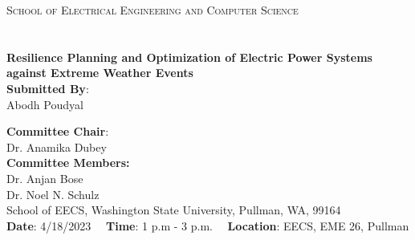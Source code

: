 \documentclass[hidelinks, 12pt]{article}
\begin{document}
\begin{titlepage}
\textsc{\large School of Electrical Engineering and Computer Science}\\[1.5cm] %
\textsc{\large {}}\\ %


\HRule \\
{ \Large \bfseries Resilience Planning and Optimization of Electric Power Systems against Extreme Weather Events}
\vspace{0.2 cm}
\HRule \\
 


\medskip
\large
{{\textbf{Submitted By}:\\ Abodh Poudyal }}\\ [0.5cm]

\medskip

\textbf{Committee Chair}:\\ Dr. Anamika Dubey \\ [0.5 cm]
\textbf{Committee Members:} \\ Dr. Anjan Bose\\
Dr. Noel N. Schulz\\

\vspace{1.5 cm}
\small School of EECS, Washington State University, Pullman, WA, 99164\\

\vspace{1.0 cm}
\small
\textbf{Date}: 4/18/2023 \ \ \textbf{Time}: 1 p.m - 3 p.m. \ \ \textbf{Location}: EECS, EME 26, Pullman


\vfill %
\end{titlepage}

\newpage


\newpage
\tableofcontents
\newpage
\end{document}
